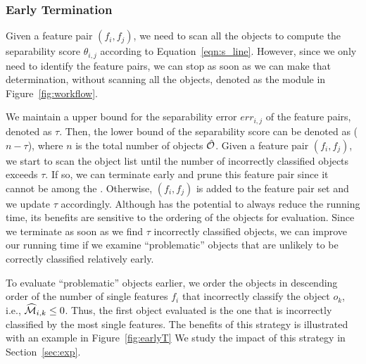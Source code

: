 \subsubsection{Early Termination} \label{ssec:earlyT}

Given a feature pair $(f_i,f_j)$,
we need to scan all the objects
to compute the separability score $\theta_{i,j}$ according to Equation~\ref{eqn:s_line}.
However, since we only need to identify the \topk feature pairs,
we can stop as soon as we can make that determination, without
scanning all the objects, denoted as the \earlyT module in Figure~\ref{fig:workflow}.

 We maintain a upper bound
for the separability error $err_{i,j}$ of the \topk feature pairs,
denoted as $\tau$.
Then, the lower bound of the separability
score can be denoted as ($n-\tau$),
where $n$ is the total number of objects $\hat{{\mathcal{O}}}$.
Given a feature pair $(f_i,f_j)$, we start to scan the object list until the number of incorrectly classified objects exceeds $\tau$. If so, we can terminate early and prune this feature pair since it cannot be among the \topk.
Otherwise, $(f_i,f_j)$ is added to the \topk feature pair set and we update $\tau$ accordingly. Although \earlyT has the potential to always reduce the running time, its benefits are sensitive to the ordering of the objects for evaluation. Since we terminate as soon as we find $\tau$ incorrectly classified objects, we can improve our running time if we examine ``problematic'' objects that are unlikely to be correctly classified relatively early.

To evaluate ``problematic'' objects earlier,
we order the objects in descending order of
the number of single features $f_i$ that incorrectly
classify the object $o_k$, i.e., $\widehat{{\mathcal{M}}}_{i,k}\leq0$.
Thus, the first object evaluated is the one that is incorrectly
classified by the most single features. The benefits of this strategy is illustrated with an example in Figure~\ref{fig:earlyT}
We study the impact of this strategy in Section~\ref{sec:exp}.




